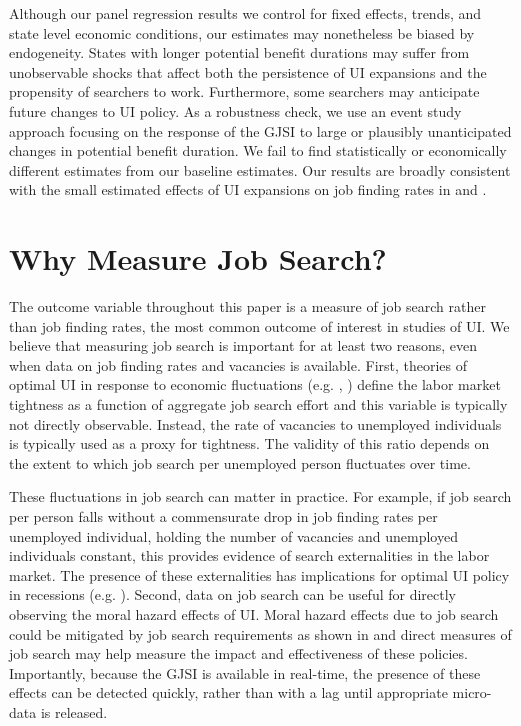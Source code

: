 \documentclass[12pt]{article}
\begin{document}
\begin{spacing}{2}
Although our panel regression results we control for fixed effects, trends, and state level economic conditions, our estimates may nonetheless be biased by endogeneity. States with longer potential benefit durations may suffer from unobservable shocks that affect both the persistence of UI expansions and the propensity of searchers to work. Furthermore, some searchers may anticipate future changes to UI policy. As a robustness check, we use an event study approach focusing on the response of the GJSI to large or plausibly unanticipated changes in potential benefit duration. We fail to find statistically or economically different estimates from our baseline estimates. Our results are broadly consistent with the small estimated effects of UI expansions on job finding rates in \citet{Rothstein2011} and \citet{Farber2013}.



\section{Why Measure Job Search?}
The outcome variable throughout this paper is a measure of job search rather than job finding rates, the most common outcome of interest in studies of UI. We believe that measuring job search is important for at least two reasons, even when data on job finding rates and vacancies is available. First, theories of optimal UI in response to economic fluctuations (e.g. \citet{Landais2015}, \citet{Schmieder2012}) define the labor market tightness as a function of aggregate job search effort and this variable is typically not directly observable. Instead, the rate of vacancies to unemployed individuals is typically used as a proxy for tightness. The validity of this ratio depends on the extent to which job search per unemployed person fluctuates over time.

These fluctuations in job search can matter in practice. For example, if job search per person falls without a commensurate drop in job finding rates per unemployed individual, holding the number of vacancies and unemployed individuals constant, this provides evidence of search externalities in the labor market. The presence of these externalities has implications for optimal UI policy in recessions (e.g. \citet{Landais2015}). Second, data on job search can be useful for directly observing the moral hazard effects of UI. Moral hazard effects due to job search could be mitigated by job search requirements as shown in \citet{Lachowska2015} and direct measures of job search may help measure the impact and effectiveness of these policies. Importantly, because the GJSI is available in real-time, the presence of these effects can be detected quickly, rather than with a lag until appropriate micro-data is released.


\end{spacing}
\end{document}
